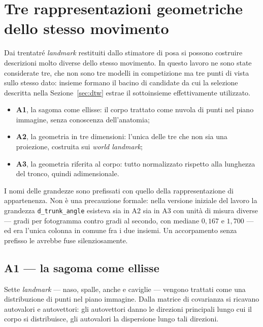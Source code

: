 
\section{Tre rappresentazioni geometriche dello stesso movimento}
\label{sec:rappresentazioni}

Dai trentatré \emph{landmark} restituiti dallo stimatore di posa si possono
costruire descrizioni molto diverse dello stesso movimento. In questo lavoro ne
sono state considerate tre, che non sono tre modelli in competizione ma tre
punti di vista sullo stesso dato: insieme formano il bacino di candidate da cui
la selezione descritta nella Sezione~\ref{sec:dtw} estrae il sottoinsieme
effettivamente utilizzato.

\begin{itemize}
    \item \textbf{A1}, la sagoma come ellisse: il corpo trattato come nuvola di
          punti nel piano immagine, senza conoscenza dell'anatomia;
    \item \textbf{A2}, la geometria in tre dimensioni: l'unica delle tre che non
          sia una proiezione, costruita sui \emph{world landmark};
    \item \textbf{A3}, la geometria riferita al corpo: tutto normalizzato
          rispetto alla lunghezza del tronco, quindi adimensionale.
\end{itemize}

I nomi delle grandezze sono prefissati con quello della rappresentazione di
appartenenza. Non è una precauzione formale: nella versione iniziale del lavoro
la grandezza \texttt{d\_trunk\_angle} esisteva sia in A2 sia in A3 con unità di
misura diverse — gradi per fotogramma contro gradi al secondo, con mediane
$0{,}167$ e $1{,}700$ — ed era l'unica colonna in comune fra i due insiemi. Un
accorpamento senza prefisso le avrebbe fuse silenziosamente.

\subsection{A1 --- la sagoma come ellisse}

Sette \emph{landmark} — naso, spalle, anche e caviglie — vengono trattati come
una distribuzione di punti nel piano immagine. Dalla matrice di covarianza si
ricavano autovalori e autovettori: gli autovettori danno le direzioni principali
lungo cui il corpo si distribuisce, gli autovalori la dispersione lungo tali
direzioni.

